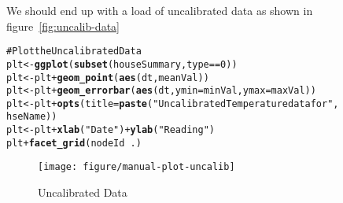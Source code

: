 \documentclass[10pt,a4paper]{article}\usepackage{graphicx, color}
\makeatletter
\def\maxwidth{ %
  \ifdim\Gin@nat@width>\linewidth
    \linewidth
  \else
    \Gin@nat@width
  \fi
}
\newcommand{\hlfunctioncall}[1]{\textcolor[rgb]{0.501960784313725,0,0.329411764705882}{\textbf{#1}}}%
\newcommand{\hlstring}[1]{\textcolor[rgb]{0.6,0.6,1}{#1}}%
\newcommand{\hlcomment}[1]{\textcolor[rgb]{0.180392156862745,0.6,0.341176470588235}{#1}}%
\newenvironment{kframe}{%
 \def\at@end@of@kframe{}%
 \ifinner\ifhmode%
  \def\at@end@of@kframe{\end{minipage}}%
  \begin{minipage}{\columnwidth}%
 \fi\fi%
 \def\FrameCommand##1{\hskip\@totalleftmargin \hskip-\fboxsep
 \colorbox{shadecolor}{##1}\hskip-\fboxsep
     \hskip-\linewidth \hskip-\@totalleftmargin \hskip\columnwidth}%
 \MakeFramed {\advance\hsize-\width
   \@totalleftmargin\z@ \linewidth\hsize
   \@setminipage}}%
 {\par\unskip\endMakeFramed%
 \at@end@of@kframe}
\newenvironment{knitrout}{}{} %
\makeatother
\begin{document}
We should end up with a load of uncalibrated data as shown in figure~\ref{fig:uncalib-data}
\begin{knitrout}
\color{fgcolor}\begin{kframe}
\begin{alltt}
\hlcomment{# Plot the Uncalibrated Data}
plt <- \hlfunctioncall{ggplot}(\hlfunctioncall{subset}(houseSummary, type == 0))
plt <- plt + \hlfunctioncall{geom_point}(\hlfunctioncall{aes}(dt, meanVal))
plt <- plt + \hlfunctioncall{geom_errorbar}(\hlfunctioncall{aes}(dt, ymin = minVal, ymax = maxVal))
plt <- plt + \hlfunctioncall{opts}(title = \hlfunctioncall{paste}(\hlstring{"Uncalibrated Temperature data for "}, 
    hseName))
plt <- plt + \hlfunctioncall{xlab}(\hlstring{"Date"}) + \hlfunctioncall{ylab}(\hlstring{"Reading"})
plt + \hlfunctioncall{facet_grid}(nodeId ~ .)
\end{alltt}
\end{kframe}\begin{figure}[h]


{\centering \texttt{[image: figure/manual-plot-uncalib]} 

}

\caption[Uncalibrated Data]{Uncalibrated Data\label{uncalib-dataplot-uncalib}}
\end{figure}


\end{knitrout}






\end{document}
